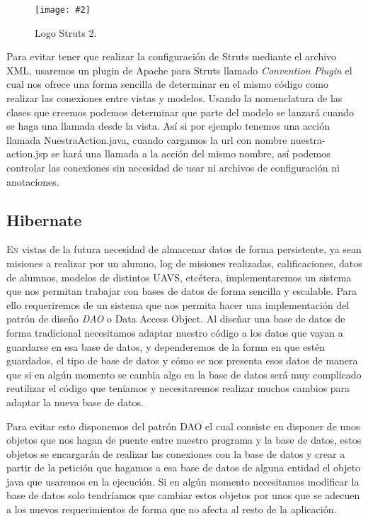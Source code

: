 \documentclass[12pt,a4paper,spanish]{book} %
\newcommand{\imgCentradaMed}[3]{
\begin{figure}[H]
\begin{center}
\texttt{[image: \#2]}
\caption{#3}
\label{#1}
\end{center}
\end{figure}
}
\begin{document}
\imgCentradaMed{fig.2.18}{img/struts2.eps}{Logo Struts 2.}

Para evitar tener que realizar la configuración de Struts mediante el archivo XML, usaremos un plugin de Apache para Struts llamado \emph{Convention Plugin} el cual nos ofrece una forma sencilla de determinar en el mismo código como realizar las conexiones entre vistas y modelos. Usando la nomenclatura de las clases que creemos podemos determinar que parte del modelo se lanzará cuando se haga una llamada desde la vista. Así si por ejemplo tenemos una acción llamada NuestraAction.java, cuando cargamos la url con nombre nuestra-action.jsp se hará una llamada a la acción del mismo nombre, así podemos controlar las conexiones sin necesidad de usar ni archivos de configuración ni anotaciones.

\newpage
\subsection{Hibernate}

\lettrine{E}{n} vistas de la futura necesidad de almacenar datos de forma persistente, ya sean misiones a realizar por un alumno, log de misiones realizadas, calificaciones, datos de alumnos, modelos de distintos UAVS, etcétera, implementaremos un sistema que nos permitan trabajar con bases de datos de forma sencilla y escalable. Para ello requeriremos de un sistema que nos permita hacer una implementación del patrón de diseño \emph{DAO} o Data Access Object. Al diseñar una base de datos de forma tradicional necesitamos adaptar nuestro código a los datos que vayan a guardarse en esa base de datos, y dependeremos de la forma en que estén guardados, el tipo de base de datos y cómo se nos presenta esos datos de manera que si en algún momento se cambia algo en la base de datos será muy complicado reutilizar el código que teníamos y necesitaremos realizar muchos cambios para adaptar la nueva base de datos.

Para evitar esto disponemos del patrón DAO el cual consiste en disponer de unos objetos que nos hagan de puente entre nuestro programa y la base de datos, estos objetos se encargarán de realizar las conexiones con la base de datos y crear a partir de la petición que hagamos a esa base de datos de alguna entidad el objeto java que usaremos en la ejecución. Si en algún momento necesitamos modificar la base de datos solo tendríamos que cambiar estos objetos por unos que se adecuen a los nuevos requerimientos de forma que no afecta al resto de la aplicación.
\end{document}
